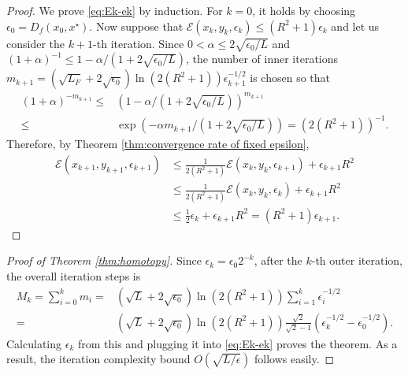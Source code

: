 \documentclass{article}
\theoremstyle{plain}
\theoremstyle{definition}
\theoremstyle{remark}
\begin{document}
	\begin{proof}
	We prove \eqref{eq:Ek-ek} by induction. For $k=0$, it holds by choosing $\epsilon_0 = D_f(x_0, x^{\star})$. Now suppose that $\mathcal E(x_k, y_k, \epsilon_{k})\leq (R^2+1)\epsilon_k$ and let us consider the $k+1$-th iteration. Since $0<\alpha\leq 2\sqrt{\epsilon_0/L}$ and $(1+\alpha)^{-1}\leq 1-\alpha/(1+2\sqrt{\epsilon_0/L})$, the number of inner iterations $m_{k+1}= (\sqrt{L_F}+2\sqrt{\epsilon_{0}})\ln (2(R^2+1))\epsilon_{k+1}^{-1/2}$
	is chosen so that
	\[
		\begin{aligned}
			(1+\alpha)^{-m_{k+1}} \leq{}& (1-\alpha/(1+2\sqrt{\epsilon_0/L}))^{m_{k+1}}\\
			\leq{}& \exp\left(-\alpha m_{k+1}/(1+2\sqrt{\epsilon_0/L})\right)= (2(R^2+1))^{-1}.
		\end{aligned}
	\]
	Therefore, by Theorem \eqref{thm:convergence rate of fixed epsilon},
	$$
	\begin{aligned}
		\mathcal E(x_{k+1}, y_{k+1}, \epsilon_{k+1}) &\leq \frac{1}{2(R^2+1)}\mathcal E(x_k, y_k, \epsilon_{k+1}) + \epsilon_{k+1} R^2\\
		&\leq \frac{1}{2(R^2+1)}\mathcal E(x_k, y_k, \epsilon_{k}) + \epsilon_{k+1} R^2\\
		&\leq \frac{1}{2}\epsilon_{k} + \epsilon_{k+1} R^2 = (R^2+1) \epsilon_{k+1}.
	\end{aligned}
	$$
\end{proof}


\begin{proof}[Proof of Theorem \ref{thm:homotopy}]
Since $\epsilon_k = \epsilon_0 2^{-k}$, after the $k$-th outer iteration, the overall iteration steps is
		\[
		\begin{aligned}
			M_k=\sum_{i=0}^{k}m_i ={}&  (\sqrt{L}+2\sqrt{\epsilon_{0}})\ln (2(R^2+1)) \sum_{i=1}^k \epsilon_{i}^{-1/2}\\
			={}& (\sqrt{L}+2\sqrt{\epsilon_{0}})\ln (2(R^2+1))\frac{\sqrt{2}}{\sqrt{2} - 1} \left(\epsilon_k^{-1/2}-\epsilon_0^{-1/2}\right).
		\end{aligned}
		\]
		Calculating $\epsilon_k$ from this and plugging it into \eqref{eq:Ek-ek} proves the theorem. As a result, the iteration complexity bound $O(\sqrt{L/\epsilon})$ follows easily.
\end{proof}
\end{document}
